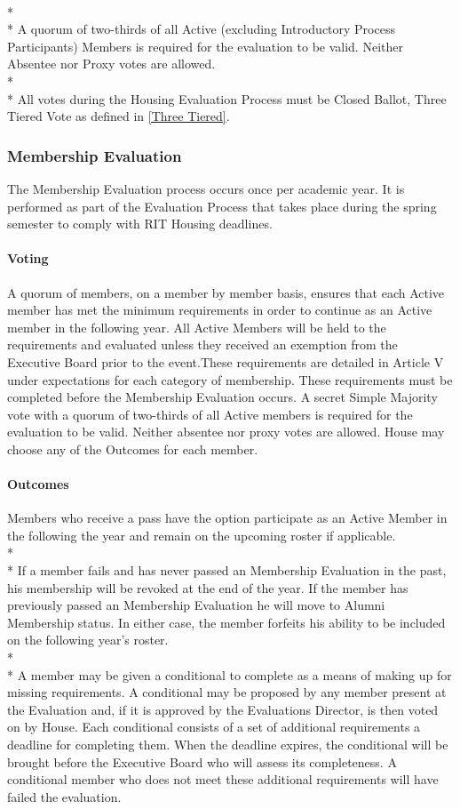 \documentclass{article}
\newcommand{\bsubsection}[1]{\subsubsection{#1} \label{#1}}
\newcommand{\bsubsubsection}[1]{\paragraph{#1} \label{#1}}
\begin{document}
\\* \\*
A quorum of two-thirds of all Active (excluding Introductory Process Participants) Members is required for the evaluation to be valid. Neither Absentee nor Proxy votes are allowed.
\\* \\*
All votes during the Housing Evaluation Process must be Closed Ballot, Three Tiered Vote as defined in \ref{Three Tiered}.
\bsubsection{Membership Evaluation}
The Membership Evaluation process occurs once per academic year. It is performed as part of the Evaluation Process that takes place during the spring semester to comply with RIT Housing deadlines.
\bsubsubsection{Voting} 
A quorum of members, on a member by member basis, ensures that each Active member has met the minimum requirements in order to continue as an Active member in the following year. All Active Members will be held to the requirements and evaluated unless they received an exemption from the Executive Board prior to the event.These requirements are detailed in Article V under expectations for each category of membership. These requirements must be completed before the Membership Evaluation occurs. A secret Simple Majority vote with a quorum of two-thirds of all Active members is required for the evaluation to be valid. Neither absentee nor proxy votes are allowed. House may choose any of the Outcomes for each member.
\bsubsubsection{Outcomes}
Members who receive a pass have the option participate as an Active Member in the following the year and remain on the upcoming roster if applicable.
\\* \\*
If a member fails and has never passed an Membership Evaluation in the past, his membership will be revoked at the end of the year. If the member has previously passed an Membership Evaluation he will move to Alumni Membership status. In either case, the member forfeits his ability to be included on the following year’s roster.
\\* \\*
A member may be given a conditional to complete as a means of making up for missing requirements. A conditional may be proposed by any member present at the Evaluation and, if it is approved by the Evaluations Director, is then voted on by House. Each conditional consists of a set of additional requirements a deadline for completing them. When the deadline expires, the conditional will be brought before the Executive Board who will assess its completeness. A conditional member who does not meet these additional requirements will have failed the evaluation.
\end{document}
